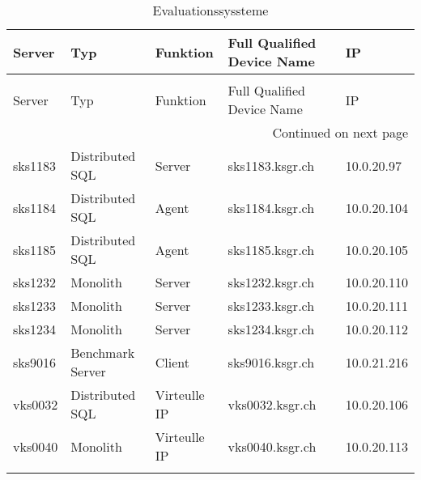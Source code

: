 \begin{longtable}[H]{lllll}

\toprule
Server & Typ & Funktion & Full Qualified Device Name & IP \\
\midrule
\endfirsthead
\caption[]{Evaluationssyssteme} \\
\toprule
Server & Typ & Funktion & Full Qualified Device Name & IP \\
\midrule
\endhead
\midrule
\multicolumn{5}{r}{Continued on next page} \\
\midrule
\endfoot
\bottomrule
\endlastfoot
sks1183 & Distributed SQL & Server & sks1183.ksgr.ch & 10.0.20.97 \\
sks1184 & Distributed SQL & Agent & sks1184.ksgr.ch & 10.0.20.104 \\
sks1185 & Distributed SQL & Agent & sks1185.ksgr.ch &  10.0.20.105 \\
sks1232 & Monolith & Server & sks1232.ksgr.ch & 10.0.20.110 \\
sks1233 & Monolith & Server & sks1233.ksgr.ch & 10.0.20.111 \\
sks1234 & Monolith & Server & sks1234.ksgr.ch & 10.0.20.112 \\
sks9016 & Benchmark Server & Client & sks9016.ksgr.ch & 10.0.21.216 \\
vks0032 & Distributed SQL & Virteulle IP & vks0032.ksgr.ch & 10.0.20.106 \\
vks0040 & Monolith & Virteulle IP & vks0040.ksgr.ch & 10.0.20.113 \\
\caption{Evaluationssyssteme} \label{evaluation_inventory}
\end{longtable}
